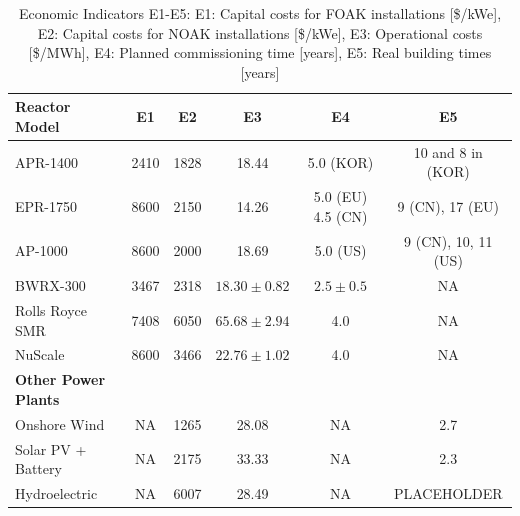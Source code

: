 \begin{table}[!hb]
    \centering
    \begin{tabularx}{\textwidth}{X c c c c c}
        \toprule
        \textbf{Reactor Model} & \textbf{E1} & \textbf{E2} & \textbf{E3} & \textbf{E4} & \textbf{E5} \\
        \midrule
        APR-1400         & 2410 & 1828 & 18.44 & 5.0 (KOR) & 10 and 8 in (KOR) \\
        EPR-1750        & 8600 & 2150 & 14.26 & 5.0 (EU) 4.5 (CN) & 9 (CN), 17 (EU) \\
        AP-1000          & 8600 & 2000 & 18.69 & 5.0 (US) & 9 (CN), 10, 11 (US) \\
        BWRX-300        & 3467 & 2318 & $18.30 \pm 0.82$ & $2.5 \pm 0.5$ & NA \\
        Rolls Royce SMR & 7408 & 6050 & $65.68 \pm 2.94$ & 4.0 & NA \\
        NuScale         & 8600 & 3466 & $22.76 \pm 1.02$ & 4.0 & NA \\
        \textbf{Other Power Plants} & & & & & \\
        Onshore Wind   & NA & 1265 & 28.08 & NA & 2.7 \\
        Solar PV + Battery & NA & 2175 & 33.33 & NA & 2.3 \\
        Hydroelectric  & NA & 6007 & 28.49 & NA & PLACEHOLDER \\
        \bottomrule
    \end{tabularx}
    \caption{Economic Indicators E1-E5: E1: Capital costs for FOAK installations [\$/kWe], E2: Capital costs for NOAK installations [\$/kWe], E3: Operational costs [\$/MWh], E4: Planned commissioning time [years], E5: Real building times [years]}
    \label{tab:consolidated-costs-building-time}
\end{table}


